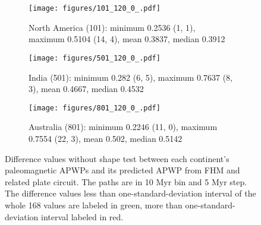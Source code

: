 \begin{figure*}
	\centering
	\begin{subfigure}{1.01\textwidth} %
		\texttt{[image: figures/101\_120\_0\_.pdf]}
		\caption{North America (101): minimum 0.2536 (1, 1), maximum 0.5104 (14, 4), mean 0.3837, median 0.3912}\label{fig-nant-dif} %
	\end{subfigure}
	\vspace{.1em} %
	\begin{subfigure}{1.01\textwidth} %
		\texttt{[image: figures/501\_120\_0\_.pdf]}
		\caption{India (501): minimum 0.282 (6, 5), maximum 0.7637 (8, 3), mean 0.4667, median 0.4532}\label{fig-indnt-dif} %
	\end{subfigure}
	\vspace{.1em}
	\begin{subfigure}{1.01\textwidth}
		\texttt{[image: figures/801\_120\_0\_.pdf]}
		\caption{Australia (801): minimum 0.2246 (11, 0), maximum 0.7554 (22, 3), mean 0.502, median 0.5142}\label{fig-aunt-dif} %
	\end{subfigure}
	\caption[Differences without shape test of each plate's paleomagnetic APWPs
versus its FHM predicted APWP]{Difference values without shape test between each
continent's paleomagnetic APWPs and its predicted APWP from FHM and related
plate circuit. The paths are in 10 Myr bin and 5 Myr step. The difference values
less than one-standard-deviation interval of the whole 168 values are labeled in
green, more than one-standard-deviation interval labeled in
red.}\label{fig-difnt} %
\end{figure*}

